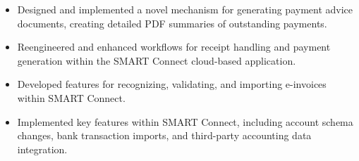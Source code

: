 \begin{minipage}{\linewidth}
\begin{itemize}
  \item Designed and implemented a novel mechanism for generating payment advice documents, creating detailed PDF summaries of outstanding payments.
  \item Reengineered and enhanced workflows for receipt handling and payment generation within the SMART Connect cloud-based application.
  \item Developed features for recognizing, validating, and importing e-invoices within SMART Connect.
  \item Implemented key features within SMART Connect, including account schema changes, bank transaction imports, and third-party accounting data integration.
\end{itemize}
\end{minipage}
\divider